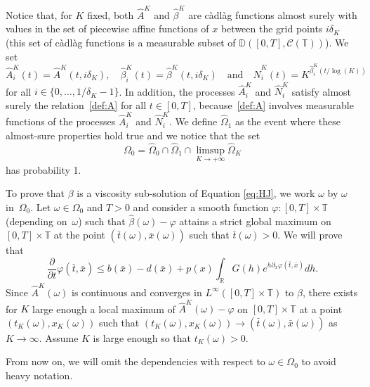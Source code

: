 \documentclass[10pt]{amsart}
\let\cal\mathcal
\theoremstyle{plain}
\theoremstyle{remark}
\newcommand\T{\mathbb{T}}
\newcommand\R{\mathbb{R}}
\begin{document}
Notice that, for $K$ fixed, both $\widehat{A}^K$ and $\widehat{\beta}^K$ are càdlàg functions almost surely with values in the set of piecewise affine functions of $x$ between the grid points $i\delta_K$ (this set of càdlàg functions is a measurable subset of $\mathbb{D}([0,T],{\cal C}(\mathbb{T}))$). We set
\[
\widehat{A}^K_i(t)=\widehat{A}^K(t,i\delta_K),\quad\widehat{\beta}^K_i(t)=\widehat{\beta}^K(t,i\delta_K)\quad\text{and}\quad\widehat{N}^K_i(t)=K^{\widehat{\beta}^K_i(t/\log(K))}
\]
for all $i\in \{0,\dots ,1/\delta_K-1\}$. In addition, the processes $\widehat{A}^K_i$ and $\widehat{N}^K_i$ satisfy almost surely the relation~\eqref{def:A} for all $t\in [0,T]$, because~\eqref{def:A} involves measurable functions of the processes $\widehat{A}^K_i$ and $\widehat{N}^K_i$. We define $\widehat{\Omega}_1$ as the event where these almost-sure properties hold true and we notice that the set
\[
\Omega_0=\widehat{\Omega}_0\cap \widehat{\Omega}_1\cap \limsup_{K\to+\infty} \widehat{\Omega}_K
\]
has probability 1.

To prove that $\beta$ is a viscosity sub-solution of Equation \eqref{eq:HJ}, we work $\omega$ by $\omega$ in~$\Omega_0$.
Let $\omega\in\Omega_0$ and $T>0$ and consider a smooth function $\varphi:[0,T]\times\T$ (depending on~$\omega$) such that $\widehat{\beta}(\omega)-\varphi$ attains a strict {global} maximum on {$[0,T]\times\T$} at the point $(\bar t(\omega),\bar x(\omega))$ such that $\bar{t}(\omega)>0$. We will prove that
\[
\frac{\partial}{\partial t} \varphi(\bar t,\bar x) \leq {b(\bar x)-d(\bar x)}+ p(x) \int_{\R} G(h)e^{h\partial_x \varphi(\bar t,\bar x)} dh.
\]
Since $\widehat{A}^K(\omega)$ is continuous and converges in $L^\infty([0,T]\times\T)$ to $\beta$, there exists for $K$ large enough a local maximum of $\widehat{A}^K(\omega)-\varphi$ on $[0,T]\times\T$ at a point $(t_K(\omega),x_K(\omega))$ such that $(t_K(\omega),x_K(\omega))\to (\bar t(\omega),\bar x(\omega))$ as $K\to \infty$. Assume $K$ is large enough so that $t_K(\omega)>0$. 

From now on, we will omit the dependencies with respect to $\omega\in\Omega_0$ to avoid heavy notation.
\end{document}

